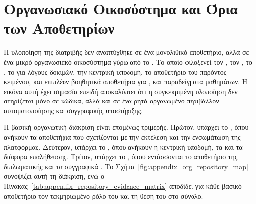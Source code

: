 \section{Οργανωσιακό Οικοσύστημα και Όρια των Αποθετηρίων}
\label{sec:appendix_ecosystem_scope}

Η υλοποίηση της διατριβής δεν αναπτύχθηκε σε ένα μονολιθικό αποθετήριο, αλλά σε ένα μικρό οργανωσιακό οικοσύστημα
γύρω από το  \texttt{}.
Το οποίο φιλοξενεί τον , τον ,
το , το  για λόγους δοκιμών, την κεντρική  υποδομή, το αποθετήριο του παρόντος κειμένου,
και επιπλέον βοηθητικά αποθετήρια για ,  και παραδείγματα μαθημάτων.
Η εικόνα αυτή έχει σημασία επειδή αποκαλύπτει ότι η συγκεκριμένη υλοποίηση δεν στηρίζεται μόνο σε κώδικα, αλλά και σε ένα 
ρητά οργανωμένο περιβάλλον αυτοματοποίησης και συγγραφικής υποστήριξης.

Η βασική οργανωτική διάκριση είναι επομένως τριμερής. Πρώτον, υπάρχει το , όπου ανήκουν τα αποθετήρια
που σχετίζονται με την εκτέλεση και την ενσωμάτωση της πλατφόρμας. Δεύτερον, υπάρχει το , όπου ανήκουν η κεντρική
υποδομή, τα  και τα διάφορα  επαλήθευσης. Τρίτον, υπάρχει το ,
όπου εντάσσονται το αποθετήριο της διπλωματικής και τα  συγγραφικά .
Το Σχήμα~\ref{fig:appendix_org_repository_map} συνοψίζει αυτή τη διάκριση, ενώ ο Πίνακας~\ref{tab:appendix_repository_evidence_matrix} 
αποδίδει για κάθε βασικό αποθετήριο τον τεκμηριωμένο ρόλο του και τη θέση του στο σύνολο.



\begin{table}[H]
\centering
\caption{Χαρτογράφηση αποθετηρίων, τεκμηρίων και ρόλων στο συνολικό τεχνικό οικοσύστημα}
\label{tab:appendix_repository_evidence_matrix}

\end{table}
